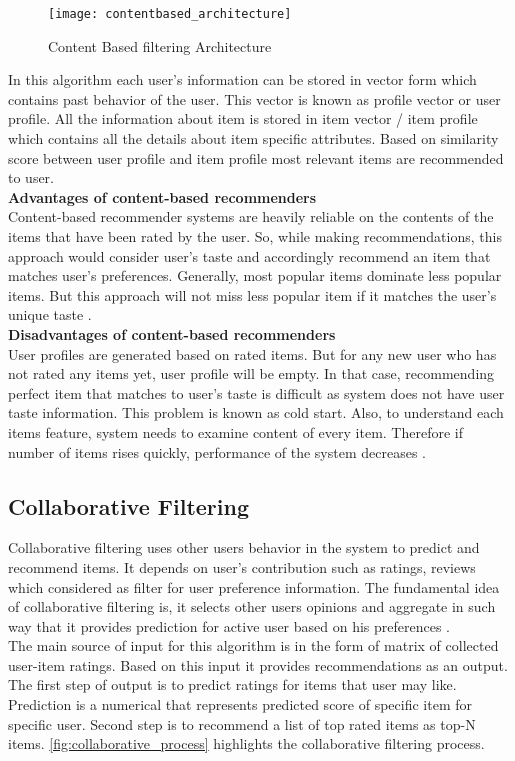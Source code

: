 \begin{figure}[H]
	\centering
	\texttt{[image: contentbased\_architecture]}
	\caption{Content Based filtering Architecture \cite{5}}
	\label{fig:contentbased_architecture}
\end{figure}

\noindent In this algorithm each user's information can be stored in vector form which contains past behavior of the user. This vector is known as profile vector or user profile. All the information about item is stored in item vector / item profile which contains all the details about item specific attributes. Based on similarity score between user profile and item profile most relevant items are recommended to user. 
\\
\textbf{ Advantages of content-based recommenders }
\\
Content-based recommender systems are heavily reliable on the contents of the items that have been rated by the user. So, while making recommendations, this approach would consider user’s taste and accordingly recommend an item that matches user’s preferences. Generally, most popular items dominate less popular items. But this approach will not miss less popular item if it matches the user’s unique taste \cite{6}.
\\
\textbf{Disadvantages of content-based recommenders}
\\
User profiles are generated based on rated items. But for any new user who has not rated any items yet, user profile will be empty. In that case, recommending perfect item that matches to user’s taste is difficult as system does not have user taste information. This problem is known as cold start. Also, to understand each items feature, system needs to examine content of every item. Therefore if number of items rises quickly, performance of the system decreases \cite{6}.  
\\

\subsection{Collaborative Filtering}
Collaborative filtering uses other users behavior in the system to predict and recommend items. It depends on user's contribution such as ratings, reviews which considered as filter for user preference information. The fundamental idea of collaborative filtering is, it selects other users opinions and aggregate in such way that it provides prediction for active user based on his preferences \cite{7}. 
\\The main source of input for this algorithm is in the form of matrix of collected user-item ratings. Based on this input it provides recommendations as an output. The first step of output is to predict ratings for items that user may like. Prediction is a numerical that represents predicted score of specific item for specific user. Second step is to recommend a list of top rated items as top-N items. \autoref{fig:collaborative_process} highlights the collaborative filtering process.
\\

